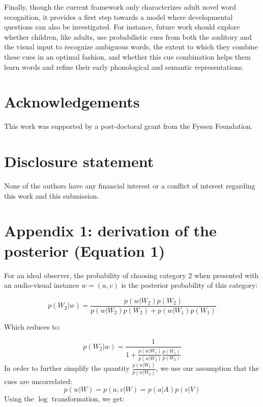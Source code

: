 \documentclass[english,,man,floatsintext]{apa6}
\theoremstyle{definition}
\theoremstyle{definition}
\theoremstyle{definition}
\theoremstyle{remark}
\begin{document}
Finally, though the current framework only characterizes adult novel
word recognition, it provides a first step towards a model where
developmental questions can also be investigated. For instance, future
work should explore whether children, like adults, use probabilistic
cues from both the auditory and the visual input to recognize ambiguous
words, the extent to which they combine these cues in an optimal
fashion, and whether this cue combination helps them learn words and
refine their early phonological and semantic representations.

\vspace{1em}

\vspace{1em}

\section{Acknowledgements}\label{acknowledgements}

This work was supported by a post-doctoral grant from the Fyssen
Foundation.

\section{Disclosure statement}\label{disclosure-statement}

None of the authors have any financial interest or a conflict of
interest regarding this work and this submission.

\section{Appendix 1: derivation of the posterior (Equation
1)}\label{appendix-1-derivation-of-the-posterior-equation-1}

For an ideal observer, the probability of choosing category 2 when
presented with an audio-visual instance \(w = (a, v)\) is the posterior
probability of this category:

\[p(W_2 | w)=\frac{p(w|W_2)p(W_2)}{p(w|W_2)p(W_2)+p(w|W_1)p(W_1)}\]

Which reduces to:

\[p(W_2 | w)=\frac{1}{1+\frac{p(w|W_1)}{p(w|W_2)} \frac{p(W_1)}{p(W_2)}}\]
In order to further simplify the quantity \(\frac{p(w|W_1)}{p(w|W_2)}\),
we use our assumption that the cues are uncorrelated:
\[p(w | W) = p(a,v| W) = p(a| A)p(v| V)\] Using the \(\log\)
transformation, we get:
\end{document}

